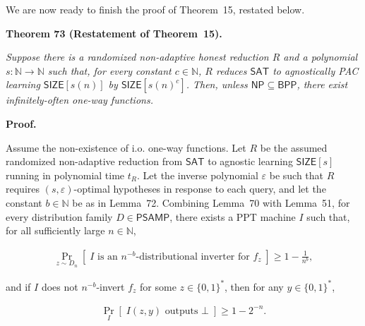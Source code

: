 We are now ready to finish the proof of Theorem 15, restated below.\par





\par\medskip\noindent\textbf{
\textbf{Theorem 73}\textbf{ }(Restatement of Theorem 15)\textbf{.}
}\par



\emph{Suppose there is a randomized non-adaptive honest reduction $R$ and a polynomial $s:\mathbb{N}\to\mathbb{N}$ such that, for every constant $c\in\mathbb{N}$, $R$ reduces ${\mathsf{SAT}}$ to agnostically PAC learning ${\mathsf{SIZE}}[s(n)]$ by ${\mathsf{SIZE}}[s(n)^{c}]$. Then, unless ${\mathsf{NP}}\subseteq{\mathsf{BPP}}$, there exist infinitely-often one-way functions.}\par







\par\medskip\noindent\textbf{Proof.}\par




Assume the non-existence of i.o. one-way functions. Let $R$ be the assumed randomized non-adaptive reduction from ${\mathsf{SAT}}$ to agnostic learning ${\mathsf{SIZE}}[s]$ running in polynomial time $t_{R}$. Let the inverse polynomial $\varepsilon$ be such that $R$ requires $(s,\varepsilon)$-optimal hypotheses in response to each query, and let the constant $b\in\mathbb{N}$ be as in Lemma 72. Combining Lemma 70 with Lemma 51, for every distribution family $D\in{\mathsf{P}}{\mathsf{SAMP}}$, there exists a PPT machine $I$ such that, for all sufficiently large $n\in\mathbb{N}$,\par


\[\begin{gathered}
\Pr_{z\sim D_{n}}[\;I\text{ is an }n^{-b}\text{-distributional inverter for }f_{z}\;]\geq 1-\frac{1}{n^{b}},
\end{gathered}\]


and if $I$ does not $n^{-b}$-invert $f_{z}$ for some $z\in\{0,1\}^{*}$, then for any $y\in\{0,1\}^{*}$,\par


\[\begin{gathered}
\Pr_{I}[\;I(z,y)\text{ outputs }\bot\;]\geq 1-2^{-n}.
\end{gathered}\]


